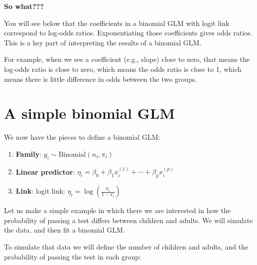 \documentclass[
  letterpaper,
  8pt,
  a4paper]{book}
\providecommand{\tightlist}{%
  \setlength{\itemsep}{0pt}\setlength{\parskip}{0pt}}
\begin{document}
\begin{tcolorbox}[enhanced jigsaw, arc=.35mm, bottomrule=.15mm, bottomtitle=1mm, breakable, colback=white, colbacktitle=quarto-callout-important-color!10!white, colframe=quarto-callout-important-color-frame, coltitle=black, left=2mm, leftrule=.75mm, opacityback=0, opacitybacktitle=0.6, rightrule=.15mm, title=\textcolor{quarto-callout-important-color}{\faExclamation}\hspace{0.5em}{Important}, titlerule=0mm, toprule=.15mm, toptitle=1mm]

\textbf{So what???}

You will see below that the coefficients in a binomial GLM with logit
link correspond to log-odds ratios. Exponentiating those coefficients
gives odds ratios. This is a key part of interpreting the results of a
binomial GLM.

For example, when we see a coefficient (e.g., slope) close to zero, that
means the log-odds ratio is close to zero, which means the odds ratio is
close to 1, which means there is little difference in odds between the
two groups.

\end{tcolorbox}

\section*{A simple binomial GLM}\label{a-simple-binomial-glm}


We now have the pieces to define a binomial GLM:

\begin{enumerate}
\def\labelenumi{\arabic{enumi}.}
\tightlist
\item
  \textbf{Family}: \(y_i \sim \text{Binomial}(n_i,\pi_i)\)
\item
  \textbf{Linear predictor}:
  \(\eta_i = \beta_0 + \beta_1 x_i^{(1)} + \cdots + \beta_p x_i^{(p)}\)
\item
  \textbf{Link}: logit link:
  \(\eta_i = \log\left(\frac{\pi_i}{1-\pi_i}\right)\)
\end{enumerate}

Let us make a simple example in which there we are interested in how the
probability of passing a test differs between children and adults. We
will simulate the data, and then fit a binomial GLM.

To simulate that data we will define the number of children and adults,
and the probability of passing the test in each group:
\end{document}
